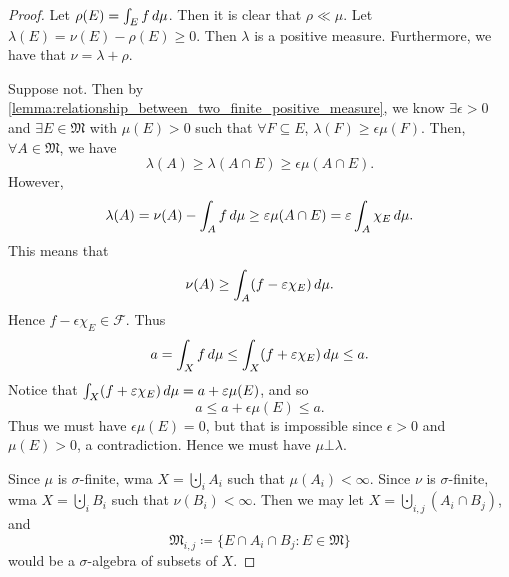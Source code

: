 \documentclass[notoc,notitlepage]{tufte-book}
\begin{document}
\begin{proof}
  Let $\rho(E) = \int_{E} f \mathop{}\!d{\mu}$. Then it is clear that $\rho \ll \mu$.
  Let $\lambda(E) = \nu(E) - \rho(E) \geq 0$. Then $\lambda$ is a positive measure.
  Furthermore, we have that $\nu = \lambda + \rho$.

  \noindent
  \hlbnotec{$\mu \bot \lambda$}
  Suppose not.
  Then by \cref{lemma:relationship_between_two_finite_positive_measure}, we know
  $\exists \epsilon > 0$ and $\exists E \in \mathfrak{M}$ with $\mu(E) > 0$
  such that $\forall F \subseteq E$, $\lambda(F) \geq \epsilon \mu(F)$.
  Then, $\forall A \in \mathfrak{M}$, we have
  \begin{equation*}
    \lambda(A) \geq \lambda(A \cap E) \geq \epsilon \mu(A \cap E).
  \end{equation*}
  However,
  \begin{equation*}
    \lambda(A) = \nu(A) - \int_{A} f \mathop{}\!d{\mu}
         \geq \varepsilon \mu(A \cap E) = \varepsilon \int_{A} \chi_E \mathop{}\!d{\mu}.
  \end{equation*}
  This means that
  \begin{equation*}
    \nu(A) \geq \int_{A} (f - \varepsilon \chi_E) \mathop{}\!d{\mu}.
  \end{equation*}
  Hence $f - \epsilon \chi_E \in \mathcal{F}$.
  Thus
  \begin{align*}
    a = \int_{X} f \mathop{}\!d{\mu} \leq \int_{X} (f + \varepsilon \chi_E) \mathop{}\!d{\mu} \leq a.
  \end{align*}
  Notice that $\int_{X} (f + \varepsilon \chi_{E}) \mathop{}\!d{\mu} = a + \varepsilon
  \mu(E)$, and so
  \begin{equation*}
    a \leq a + \epsilon \mu(E) \leq a.
  \end{equation*}
  Thus we must have $\epsilon \mu(E) = 0$, but that is impossible since
  $\epsilon > 0$ and $\mu(E) > 0$, a contradiction.
  Hence we must have $\mu \bot \lambda$.

  \noindent
  Since $\mu$ is $\sigma$-finite,
  wma $X = \bigcupdot_i A_i$ such that $\mu(A_i) < \infty$.
  Since $\nu$ is $\sigma$-finite,
  wma $X = \bigcupdot_i B_i$ such that $\nu(B_i) < \infty$.
  Then we may let $X = \bigcupdot_{i, j} (A_i \cap B_j)$, and
  \begin{equation*}
    \mathfrak{M}_{i, j} \coloneqq \{ E \cap A_i \cap B_j : E \in \mathfrak{M} \}
  \end{equation*}
  would be a $\sigma$-algebra of subsets of $X$.


\end{proof}
\end{document}
